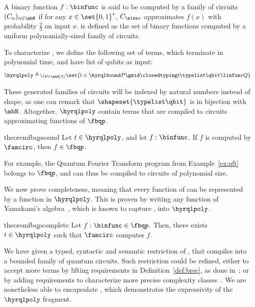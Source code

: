 \begin{definition}[\cite{BV97}]
  \label{def:fbqp}
  A binary function $f : \binfunc$ is said to be computed by a family of
  circuits $(C_n)_{n \in \mbN}$ if for any $x \in \set{0,1}^*$, $C_{\size x}$
  approximates $f(x)$ with probability $\frac 2 3$ on input $x$. \fbqp{} is
  defined as the set of binary functions computed by a uniform
  polynomially-sized family of circuits.
\end{definition}

To characterize \fbqp{}, we define the following set of terms, which terminate 
in polynomial time, and have list of qubits as input:
\[
  \hyrqlpoly \triangleq \cup_{P \in \mbN[X]} \set{
    t \in \hyrqlbound P \gmid \closedtyping t \typelist \qbit \linfunc Q
  }
\]

These generated families of circuits will be indexed by natural numbers
instead of shape, as one can remark that $\shapeset{\typelist \qbit}$ is in
bijection with $\mbN$.
Altogether, $\hyrqlpoly$ contain terms that are
compiled to circuits approximating functions of $\fbqp$.

\begin{restatable}{theorem}{fbqpsound}
  \label{thm:fbqp-sound}
  Let $t \in \hyrqlpoly$, and let $f : \binfunc$. If $f$ is computed by
  $\famcirc$, then $f \in \fbqp$.
\end{restatable}

For example, the Quantum Fourier Transform program from Example~\ref{ex:qft}
belongs to $\fbqp$, and can thus be compiled to circuits of polynomial size.

We now prove \fbqp{} completeness, meaning that every function of \fbqp{} can
be represented by a function in $\hyrqlpoly$. This is proven by writing
any function of Yamakami's algebra~\cite{Yam20}, which is known to capture
\fbqp{}, into $\hyrqlpoly$.

\begin{restatable}{theorem}{fbqpcomplete}
  \label{thm:fbqp-complete}
  Let $f : \binfunc \in \fbqp$. Then, there exists $t \in \hyrqlpoly$
  such that $\famcirc$ computes $f$.
\end{restatable}

We have given a typed, syntactic and semantic restriction of \hyrql{}, that
compiles into a bounded family of quantum circuits. Such restriction could be
refined, either to accept more terms by lifting requirements in
Definition~\ref{def:brec}, as done in~\cite{HPS25}; or by adding requirements
to characterize more precise complexity classes~\cite{FHPS25}. We are
nonetheless able to encapsulate \fbqp{}, which demonstrates the expressivity of
the $\hyrqlpoly$ fragment.

